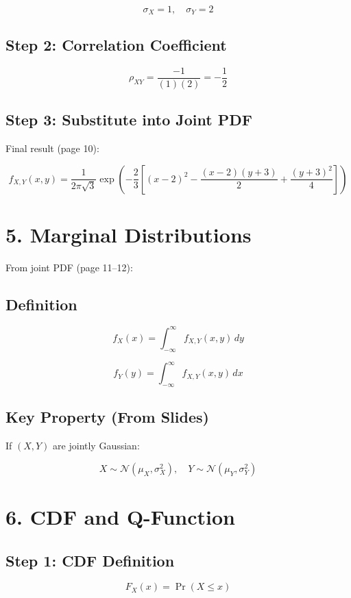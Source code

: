\documentclass[11pt]{article}
\begin{document}
\[
\sigma_X = 1, \quad \sigma_Y = 2
\]

\subsection*{Step 2: Correlation Coefficient}

\[
\rho_{XY} = \frac{-1}{(1)(2)} = -\frac{1}{2}
\]

\subsection*{Step 3: Substitute into Joint PDF}

Final result (page 10):

\[
f_{X,Y}(x,y)
=
\frac{1}{2\pi \sqrt{3}}
\exp \left(
-\frac{2}{3}
\left[
(x-2)^2
- \frac{(x-2)(y+3)}{2}
+ \frac{(y+3)^2}{4}
\right]
\right)
\]

\section*{5. Marginal Distributions}

From joint PDF (page 11--12):

\subsection*{Definition}

\[
f_X(x) = \int_{-\infty}^{\infty} f_{X,Y}(x,y)\,dy
\]

\[
f_Y(y) = \int_{-\infty}^{\infty} f_{X,Y}(x,y)\,dx
\]

\subsection*{Key Property (From Slides)}

If $(X, Y)$ are jointly Gaussian:

\[
X \sim \mathcal{N}(\mu_X, \sigma_X^2), \quad
Y \sim \mathcal{N}(\mu_Y, \sigma_Y^2)
\]

\section*{6. CDF and Q-Function}

\subsection*{Step 1: CDF Definition}

\[
F_X(x) = \Pr(X \le x)
\]
\end{document}
